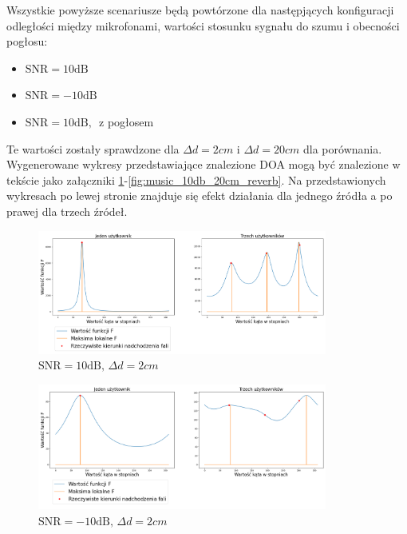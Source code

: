 \noindent Wszystkie powyższe scenariusze będą powtórzone dla następjących konfiguracji odległości między mikrofonami, wartości stosunku sygnału do szumu i obecności pogłosu:

\begin{itemize}
    \item $\mathrm{SNR}=10\mathrm{dB}$ 
    \item $\mathrm{SNR}=-10\mathrm{dB}$
    \item $\mathrm{SNR}=10\mathrm{dB}, \, $ z pogłosem
\end{itemize}

\noindent Te wartości zostały sprawdzone dla $\Delta d = 2cm$ i $\Delta d = 20cm$ dla porównania. Wygenerowane wykresy przedstawiające znalezione DOA mogą być znalezione w tekście jako załączniki \ref{fig:music_10db_2cm}-\ref{fig:music_10db_20cm_reverb}. Na przedstawionych wykresach po lewej stronie znajduje się efekt działania dla jednego źródła a po prawej dla trzech źródeł.

\begin{figure}[H]
    \centering
    \includegraphics[width=0.85\textwidth]{Images/music_10db.png}
    \caption{$\mathrm{SNR}=10\mathrm{dB}, \, \Delta d = 2cm$}
    \label{fig:music_10db_2cm}
\end{figure}

\begin{figure}[H]
    \centering
    \includegraphics[width=0.85\textwidth]{Images/music_-10db.png}
    \caption{$\mathrm{SNR}=-10\mathrm{dB}, \, \Delta d = 2cm$}
    \label{fig:music_-10db_2cm}
\end{figure}


